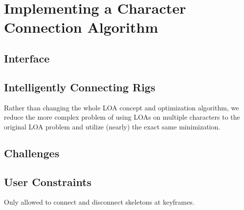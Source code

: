 \chapter{Implementing a Character Connection Algorithm}\label{chap:implementation}


\section{Interface}


\section{Intelligently Connecting Rigs}
Rather than changing the whole LOA concept and optimization algorithm, we reduce the more complex problem of using LOAs on multiple characters to the original LOA problem and utilize (nearly) the exact same minimization.

\section{Challenges}


\section{User Constraints}
Only allowed to connect and disconnect skeletons at keyframes.
